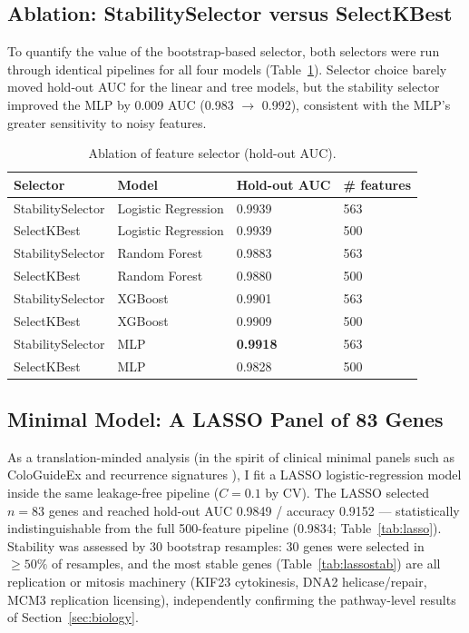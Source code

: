 \documentclass[11pt]{article}
\begin{document}
\subsection{Ablation: StabilitySelector versus SelectKBest}
\label{sec:ablation}
To quantify the value of the bootstrap-based selector, both selectors were run through identical pipelines for all four models (Table~\ref{tab:ablation}). Selector choice barely moved hold-out AUC for the linear and tree models, but the stability selector improved the MLP by 0.009 AUC (0.983 $\rightarrow$ 0.992), consistent with the MLP's greater sensitivity to noisy features.

\begin{table}[htbp]
\centering
\caption{Ablation of feature selector (hold-out AUC).}
\label{tab:ablation}
\begin{tabular}{llll}
\toprule
\textbf{Selector} & \textbf{Model} & \textbf{Hold-out AUC} & \textbf{\# features} \\
\midrule
StabilitySelector & Logistic Regression & 0.9939 & 563 \\
SelectKBest & Logistic Regression & 0.9939 & 500 \\
StabilitySelector & Random Forest & 0.9883 & 563 \\
SelectKBest & Random Forest & 0.9880 & 500 \\
StabilitySelector & XGBoost & 0.9901 & 563 \\
SelectKBest & XGBoost & 0.9909 & 500 \\
StabilitySelector & MLP & \textbf{0.9918} & 563 \\
SelectKBest & MLP & 0.9828 & 500 \\
\bottomrule
\end{tabular}
\end{table}

\subsection{Minimal Model: A LASSO Panel of 83 Genes}
As a translation-minded analysis (in the spirit of clinical minimal panels such as ColoGuideEx \cite{agesen2012} and recurrence signatures \cite{oconnell2010}), I fit a LASSO logistic-regression model \cite{tibshirani1996} inside the same leakage-free pipeline ($C = 0.1$ by CV). The LASSO selected $n = 83$ genes and reached hold-out AUC 0.9849 / accuracy 0.9152 --- statistically indistinguishable from the full 500-feature pipeline (0.9834; Table~\ref{tab:lasso}). Stability was assessed by 30 bootstrap resamples: 30 genes were selected in $\geq 50\%$ of resamples, and the most stable genes (Table~\ref{tab:lassostab}) are all replication or mitosis machinery (KIF23 cytokinesis, DNA2 helicase/repair, MCM3 replication licensing), independently confirming the pathway-level results of Section~\ref{sec:biology}.
\end{document}
